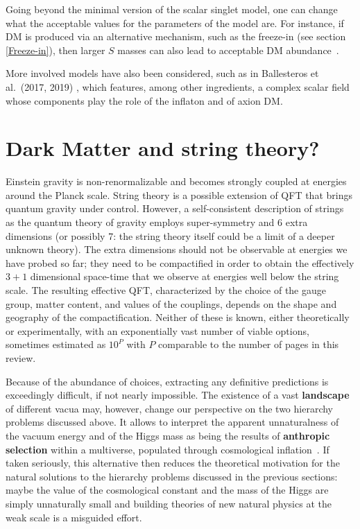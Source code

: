 Going beyond the minimal version of the scalar singlet model, 
one can change what the acceptable values for the parameters of the model are. 
For instance, if DM is produced via an alternative mechanism, such as the freeze-in (see section \ref{Freeze-in}), then larger $S$ masses can also lead to acceptable DM abundance~\cite{DMasInflaton}.

More involved models have also been considered, such as in Ballesteros et al.~(2017, 2019) \cite{DMasInflaton}, which features, 
among other ingredients, a complex scalar field whose components play the role of the inflaton and of axion DM.






\section{Dark Matter and string theory?}\label{sec:swampDM}


Einstein gravity is non-renormalizable and becomes strongly coupled at energies around the Planck scale.
String theory is a possible extension of QFT that brings quantum gravity under control.
However, a self-consistent description of strings as the quantum theory of gravity employs super-symmetry and 6 extra dimensions
(or possibly 7: the string theory itself could be a limit of a deeper unknown theory).
The extra dimensions should not be observable at energies we have probed so far; they need to be compactified 
in order to obtain the effectively $3+1$ dimensional space-time that we observe at energies well below the string scale.
The resulting effective QFT, characterized by the choice of the gauge group, matter content, and values of the couplings,
depends on the shape and geography of the compactification. 
Neither of these is known, either theoretically or experimentally,
with an  exponentially vast number of viable options,
sometimes estimated as $10^P$ with $P$ comparable to the number of pages in this review.

Because of the abundance of choices, extracting any definitive predictions is exceedingly difficult, if not nearly impossible.
 The existence of a vast  {\bf landscape} of different vacua may, however, change our perspective on the two hierarchy problems discussed above.
 It allows to interpret the apparent unnaturalness of
the vacuum energy and of the Higgs mass as being the results of {\bf anthropic selection} within a multiverse, populated through cosmological inflation~\cite{anthropic}.
If taken seriously, this alternative then reduces the theoretical motivation for the natural solutions to the hierarchy problems discussed in the previous sections:
maybe the value of the cosmological constant and the mass of the Higgs are simply unnaturally small and building theories of new natural physics at the weak scale is a misguided effort. 



